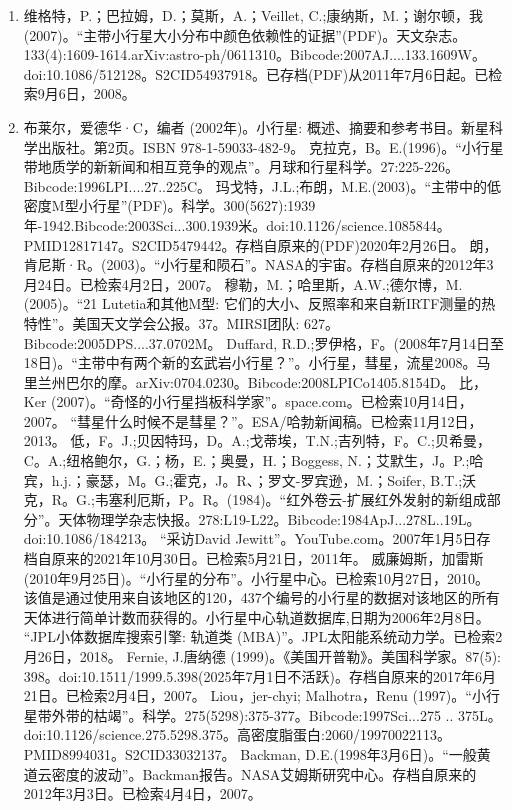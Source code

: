 \begin{enumerate}
\item 维格特，P.；巴拉姆，D.；莫斯，A.；Veillet, C.;康纳斯，M.；谢尔顿，我(2007)。“主带小行星大小分布中颜色依赖性的证据”(PDF)。天文杂志。133(4):1609-1614.arXiv:astro-ph/0611310。Bibcode:2007AJ....133.1609W。doi:10.1086/512128。S2CID54937918。已存档(PDF)从2011年7月6日起。已检索9月6日，2008。  
\item 布莱尔，爱德华·C，编者 (2002年)。小行星: 概述、摘要和参考书目。新星科学出版社。第2页。ISBN 978-1-59033-482-9。
 克拉克，B。E.(1996)。“小行星带地质学的新新闻和相互竞争的观点”。月球和行星科学。27:225-226。Bibcode:1996LPI....27..225C。
 玛戈特，J.L.;布朗，M.E.(2003)。“主带中的低密度M型小行星”(PDF)。科学。300(5627):1939年-1942.Bibcode:2003Sci...300.1939米。doi:10.1126/science.1085844。PMID12817147。S2CID5479442。存档自原来的(PDF)2020年2月26日。   
 朗，肯尼斯·R。(2003)。“小行星和陨石”。NASA的宇宙。存档自原来的2012年3月24日。已检索4月2日，2007。
 穆勒，M.；哈里斯，A.W.;德尔博，M.(2005)。“21 Lutetia和其他M型: 它们的大小、反照率和来自新IRTF测量的热特性”。美国天文学会公报。37。MIRSI团队: 627。Bibcode:2005DPS....37.0702M。
 Duffard, R.D.;罗伊格，F。(2008年7月14日至18日)。“主带中有两个新的玄武岩小行星？”。小行星，彗星，流星2008。马里兰州巴尔的摩。arXiv:0704.0230。Bibcode:2008LPICo1405.8154D。
 比，Ker (2007)。“奇怪的小行星挡板科学家”。space.com。已检索10月14日，2007。
 “彗星什么时候不是彗星？”。ESA/哈勃新闻稿。已检索11月12日，2013。
 低，F。J.;贝因特玛，D。A.;戈蒂埃，T.N.;吉列特，F。C.;贝希曼，C。A.;纽格鲍尔，G.；杨，E.；奥曼，H.；Boggess, N.；艾默生，J。P.;哈宾，h.j.；豪瑟，M。G.;霍克，J。R、；罗文-罗宾逊，M.；Soifer, B.T.;沃克，R。G.;韦塞利厄斯，P。R。(1984)。“红外卷云-扩展红外发射的新组成部分”。天体物理学杂志快报。278:L19-L22。Bibcode:1984ApJ...278L..19L。doi:10.1086/184213。
 “采访David Jewitt”。YouTube.com。2007年1月5日存档自原来的2021年10月30日。已检索5月21日，2011年。
 威廉姆斯，加雷斯 (2010年9月25日)。“小行星的分布”。小行星中心。已检索10月27日，2010。
 该值是通过使用来自该地区的120，437个编号的小行星的数据对该地区的所有天体进行简单计数而获得的。小行星中心轨道数据库,日期为2006年2月8日。
 “JPL小体数据库搜索引擎: 轨道类 (MBA)”。JPL太阳能系统动力学。已检索2月26日，2018。
 Fernie, J.唐纳德 (1999)。《美国开普勒》。美国科学家。87(5): 398。doi:10.1511/1999.5.398(2025年7月1日不活跃)。存档自原来的2017年6月21日。已检索2月4日，2007。
 Liou，jer-chyi; Malhotra，Renu (1997)。“小行星带外带的枯竭”。科学。275(5298):375-377。Bibcode:1997Sci...275 .. 375L。doi:10.1126/science.275.5298.375。高密度脂蛋白:2060/19970022113。PMID8994031。S2CID33032137。  
 Backman, D.E.(1998年3月6日)。“一般黄道云密度的波动”。Backman报告。NASA艾姆斯研究中心。存档自原来的2012年3月3日。已检索4月4日，2007。

\end{enumerate}
